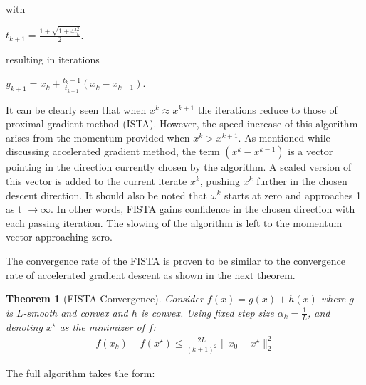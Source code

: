 \documentclass[10pt]{article} %
\newtheorem{theorem}{Theorem}
\begin{document}
\noindent with 

\begin{center}
    $t_{k+1} = \frac{1 + \sqrt{1 + 4t_k^2}}{2}$.
\end{center}

\noindent  resulting in iterations

\begin{center}
    $y_{k+1} = x_k + \frac{t_k - 1}{t_{k+1}} (x_k - x_{k-1})$.    
\end{center}

It can be clearly seen that when $x^k \approx x^{k+1}$ the iterations reduce to those of proximal gradient method (ISTA). However, the speed increase of this algorithm arises from the momentum provided when $x^k > x^{k+1}$. As mentioned while discussing accelerated gradient method, the term $(x^k - x^{k-1})$ is a vector pointing in the direction currently chosen by the algorithm. A scaled version of this vector is added to the current iterate $x^k$, pushing $x^k$ further in the chosen descent direction. It should also be noted that $\omega^k$ starts at zero and approaches 1 as t $\rightarrow \infty$. In other words, FISTA gains confidence in the chosen direction with each passing iteration. The slowing of the algorithm is left to the momentum vector approaching zero. 

\vspace{\baselineskip}
The convergence rate of the FISTA is proven to be similar to the convergence rate of accelerated gradient descent as shown in the next theorem.
\begin{theorem}[FISTA Convergence]
        Consider $f(x)=g(x)+h(x)$ where $g$ is $L$-smooth and convex and $h$ is convex. Using fixed step size $\alpha_k=\frac{1}{L}$, and denoting $x^\star$ as the minimizer of $f$:
        \begin{align*}
            f(x_k)-f(x^\star)\leq\frac{2L}{(k+1)^2}\|x_0-x^\star\|_2^2
        \end{align*}
    \end{theorem}
    
The full algorithm takes the form:




\end{document}
